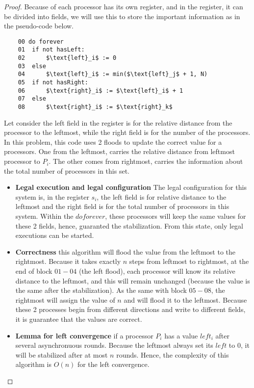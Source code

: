 \documentclass[12pt]{article}
\begin{document}
\begin{proof}

Because of each processor has its own register, and in the register, it can be divided into fields,
we will use this to store the important information as in the pseudo-code below.

\begin{lstlisting}
    00 do forever
    01  if not hasLeft:
    02      $\text{left}_i$ := 0
    03  else
    04      $\text{left}_i$ := min($\text{left}_j$ + 1, N)
    05  if not hasRight:
    06      $\text{right}_i$ := $\text{left}_i$ + 1
    07  else
    08      $\text{right}_i$ := $\text{right}_k$
\end{lstlisting}

Let consider the left field in the register is for the relative distance from the processor to the leftmost,
while the right field is for the number of the processors. In this problem, this code uses 2 floods to update the correct value for a processors. One from the leftmost, 
carries the relative distance from leftmost processor to $P_i$. The other comes from rightmost, carries the 
information about the total number of processors in this set.

\begin{itemize}
    \item \textbf{Legal execution and legal configuration} The legal configuration for this system is, in the
    register $s_i$, the left field is for relative distance to the leftmost and the right field is for the total
    number of processors in this system. Within the $do forever$, these processors will keep the same values for
    these 2 fields, hence, guaranted the stabilization. From this state, only legal executions can be started.

    \item \textbf{Correctness} this algorithm will flood the value from the leftmost to the rightmost. Because
    it takes exactly $n$ steps from leftmost to rightmost, at the end of block $01 - 04$ (the left flood), each 
    processor will know its relative distance to the leftmost, and this will remain unchanged (because the value is 
    the same after the stabilization). As the same with block $05-08$, the rightmost will assign the value of $n$
    and will flood it to the leftmost. Because these 2 processes begin from different directions and write to different
    fields, it is guarantee that the values are correct.

    \item \textbf{Lemma for left convergence} if a processor $P_i$ has a value $left_i$ after several asynchronuous rounds.
    Because the leftmost always set its $left$ to 0, it will be stabilized after at most $n$ rounds. Hence, the complexity of 
    this algorithm is $O(n)$ for the left convergence.
    

\end{itemize}
\end{proof}
\end{document}
